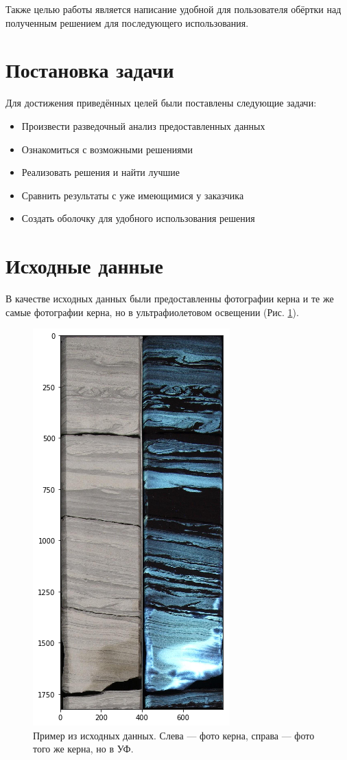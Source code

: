 \documentclass[14pt]{matmex-diploma}
\begin{document}
    Также целью работы является написание удобной для пользователя обёртки над полученным решением для последующего использования.


\section{Постановка задачи}

    Для достижения приведённых целей были поставлены следующие задачи:
    
    \begin{itemize}
        \item Произвести разведочный анализ предоставленных данных
        \item Ознакомиться с возможными решениями
        \item Реализовать решения и найти лучшие
        \item Сравнить результаты с уже имеющимися у заказчика
        \item Создать оболочку для удобного использования решения
    \end{itemize}    
    

\section{Исходные данные}

    В качестве исходных данных были предоставленны фотографии керна и те же самые фотографии керна, но в ультрафиолетовом освещении (Рис. \ref{sample}).
    
    \begin{figure}[h]
        \centering
        \includegraphics[scale=0.4]{images/sample.png}
        \caption{Пример из исходных данных. Слева — фото керна, справа — фото того же керна, но в УФ.}
        \label{sample}
    \end{figure}       
    
\end{document}
